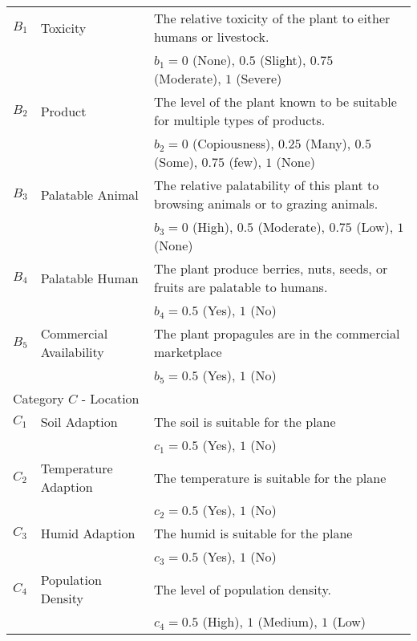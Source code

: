 \documentclass[12pt]{article}
\begin{document}
{{\begin{longtable}{p{0.2in}p{1.5in}p{4.3in}}
				$B_1$ & Toxicity & The relative toxicity of the plant to either humans or livestock.\\
					&& $b_1=0$ (None), $0.5$ (Slight), $0.75$ (Moderate), $1$ (Severe)\\
				$B_2$ & Product & The level of the plant known to be suitable for multiple types of products.\\
					&& $b_2=0$ (Copiousness), $0.25$ (Many), $0.5$ (Some), $0.75$ (few), $1$ (None)\\
				$B_3$ & Palatable Animal & The relative palatability of this plant to browsing animals or to grazing animals.\\
					&& $b_3=0$ (High), $0.5$ (Moderate), $0.75$ (Low), $1$ (None)\\
				$B_4$ & Palatable Human & The plant produce berries, nuts, seeds, or fruits are palatable to humans. \\
					&& $b_4=0.5$ (Yes), $1$ (No)\\
				$B_5$ & Commercial Availability & The plant propagules are in the commercial marketplace \\
					&& $b_5=0.5$ (Yes), $1$ (No)\\
			
				\midrule
				\multicolumn{3}{l}{Category $C$ - Location}  \\
				\midrule
				
				$C_1$ & Soil Adaption & The soil is suitable for the plane\\
					&& $c_1=0.5$ (Yes), $1$ (No)\\
				$C_2$ & Temperature Adaption & The temperature is suitable for the plane\\
					&& $c_2=0.5$ (Yes), $1$ (No)\\
				$C_3$ & Humid Adaption & The humid is suitable for the plane\\
					&& $c_3=0.5$ (Yes), $1$ (No)\\
				$C_4$ & Population Density & The level of population density.\\
					&& $c_4=0.5$ (High), $1$ (Medium), $1$ (Low)\\
			
				\bottomrule
			
			\end{longtable}
			}
		}
		
\end{document}
